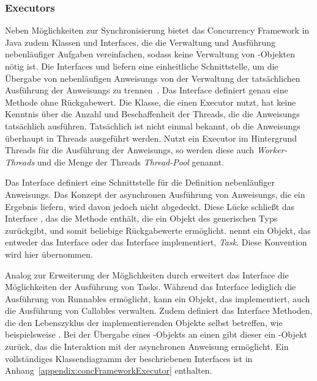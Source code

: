 \subsubsection{Executors}\label{sec:executor} Neben Möglichkeiten zur Synchronisierung bietet das Concurrency Framework in Java zudem Klassen und Interfaces, die die Verwaltung und Ausführung nebenläufiger Aufgaben vereinfachen, sodass keine Verwaltung von -Objekten nötig ist. Die Interfaces  und  liefern eine einheitliche Schnittstelle, um die Übergabe von nebenläufigen \glspl{Anweisung} von der Verwaltung der tatsächlichen Ausführung der \glspl{Anweisung} zu trennen~\cite[S.~70~ff.]{Friesen2015}. Das Interface  definiert genau eine Methode  ohne Rückgabewert. Die Klasse, die einen Executor nutzt, hat keine Kenntnis über die Anzahl und Beschaffenheit der Threads, die die \glspl{Anweisung} tatsächlich ausführen. Tatsächlich ist nicht einmal bekannt, ob die \glspl{Anweisung} überhaupt in Threads ausgeführt werden. Nutzt ein Executor im Hintergrund Threads für die Ausführung der \glspl{Anweisung}, so werden diese auch \emph{Worker-Threads} und die Menge der Threads \emph{Thread-Pool} genannt.

Das Interface  definiert eine Schnittstelle für die Definition nebenläufiger \glspl{Anweisung}. Das Konzept der asynchronen Ausführung von \glspl{Anweisung}, die ein Ergebnis liefern, wird davon jedoch nicht abgedeckt. Diese Lücke schließt das Interface , das die Methode  enthält, die ein Objekt des generischen Typs  zurückgibt, und somit beliebige Rückgabewerte ermöglicht. \textcite{Friesen2015} nennt ein Objekt, das entweder das Interface  oder das Interface  implementiert, \emph{Task}. Diese Konvention wird hier übernommen. 

Analog zur Erweiterung der Möglichkeiten durch  erweitert das Interface  die Möglichkeiten der Ausführung von Tasks. Während das Interface  lediglich die Ausführung von Runnables ermöglicht, kann ein Objekt, das  implementiert, auch die Ausführung von Callables verwalten. Zudem definiert das Interface Methoden, die den Lebenszyklus der implementierenden Objekte selbst betreffen, wie beispielsweise . Bei der Übergabe eines -Objekts an einen  gibt dieser ein -Objekt zurück, das die Interaktion mit der asynchronen \gls{Anweisung} ermöglicht. Ein vollständiges Klassendiagramm der beschriebenen Interfaces ist in Anhang~\ref{appendix:concFrameworkExecutor} enthalten.

